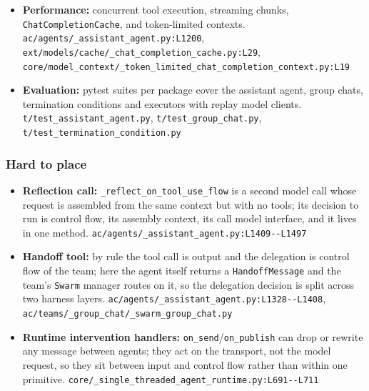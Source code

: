 \begin{itemize}
\item \textbf{Performance:} concurrent tool execution, streaming chunks, \texttt{ChatCompletionCache}, and token-limited contexts. \texttt{ac/\allowbreak{}agents/\allowbreak{}\_\allowbreak{}assistant\_\allowbreak{}agent.\allowbreak{}py:\allowbreak{}L1200}, \texttt{ext/\allowbreak{}models/\allowbreak{}cache/\allowbreak{}\_\allowbreak{}chat\_\allowbreak{}completion\_\allowbreak{}cache.\allowbreak{}py:\allowbreak{}L29}, \texttt{core/\allowbreak{}model\_\allowbreak{}context/\allowbreak{}\_\allowbreak{}token\_\allowbreak{}limited\_\allowbreak{}chat\_\allowbreak{}completion\_\allowbreak{}context.\allowbreak{}py:\allowbreak{}L19}
\item \textbf{Evaluation:} pytest suites per package cover the assistant agent, group chats, termination conditions and executors with replay model clients. \texttt{t/\allowbreak{}test\_\allowbreak{}assistant\_\allowbreak{}agent.\allowbreak{}py}, \texttt{t/\allowbreak{}test\_\allowbreak{}group\_\allowbreak{}chat.\allowbreak{}py}, \texttt{t/\allowbreak{}test\_\allowbreak{}termination\_\allowbreak{}condition.\allowbreak{}py}
\end{itemize}

\subsubsection*{Hard to place}
\begin{itemize}
\item \textbf{Reflection call:} \texttt{\_\allowbreak{}reflect\_\allowbreak{}on\_\allowbreak{}tool\_\allowbreak{}use\_\allowbreak{}flow} is a second model call whose request is assembled from the same context but with no tools; its decision to run is control flow, its assembly context, its call model interface, and it lives in one method. \texttt{ac/\allowbreak{}agents/\allowbreak{}\_\allowbreak{}assistant\_\allowbreak{}agent.\allowbreak{}py:\allowbreak{}L1409-\allowbreak{}-\allowbreak{}L1497}
\item \textbf{Handoff tool:} by rule the tool call is output and the delegation is control flow of the team; here the agent itself returns a \texttt{HandoffMessage} and the team's \texttt{Swarm} manager routes on it, so the delegation decision is split across two harness layers. \texttt{ac/\allowbreak{}agents/\allowbreak{}\_\allowbreak{}assistant\_\allowbreak{}agent.\allowbreak{}py:\allowbreak{}L1328-\allowbreak{}-\allowbreak{}L1408}, \texttt{ac/\allowbreak{}teams/\allowbreak{}\_\allowbreak{}group\_\allowbreak{}chat/\allowbreak{}\_\allowbreak{}swarm\_\allowbreak{}group\_\allowbreak{}chat.\allowbreak{}py}
\item \textbf{Runtime intervention handlers:} \texttt{on\_\allowbreak{}send}/\texttt{on\_\allowbreak{}publish} can drop or rewrite any message between agents; they act on the transport, not the model request, so they sit between input and control flow rather than within one primitive. \texttt{core/\allowbreak{}\_\allowbreak{}single\_\allowbreak{}threaded\_\allowbreak{}agent\_\allowbreak{}runtime.\allowbreak{}py:\allowbreak{}L691-\allowbreak{}-\allowbreak{}L711}
\end{itemize}

